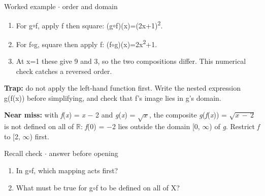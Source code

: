 \documentclass[11pt]{article}
\begin{document}
\begin{keepsection}
\begin{workedbox}{Worked example \ensuremath{\cdot} order and domain}
\begin{enumerate}
\item For g\ensuremath{\circ}f, apply f then square: (g\ensuremath{\circ}f)(x)=(2x+1)\textsuperscript{2}.
\item For f\ensuremath{\circ}g, square then apply f: (f\ensuremath{\circ}g)(x)=2x\textsuperscript{2}+1.
\item At x=1 these give 9 and 3, so the two compositions differ. This numerical check catches a reversed order.
\end{enumerate}
\end{workedbox}

\begin{notebox}\textbf{Trap:} do not apply the left-hand function first. Write the nested expression g(f(x)) before simplifying, and check that f’s image lies in g’s domain.\end{notebox}

\begin{notebox}\textbf{Near miss:} with \textit{f}(\textit{x}) = \textit{x} \ensuremath{-} 2 and \textit{g}(\textit{x}) = \ensuremath{\sqrt{{x}}}, the composite \textit{g}(\textit{f}(\textit{x})) = \ensuremath{\sqrt{{x}\, -\, 2}} is not defined on all of \ensuremath{\mathbb{R}}: \textit{f}(0) = \ensuremath{-}2 lies outside the domain [0, \ensuremath{\infty}) of \textit{g}. Restrict \textit{f} to [2, \ensuremath{\infty}) first.\end{notebox}

\begin{recallbox}{Recall check \ensuremath{\cdot} answer before opening}
\begin{enumerate}
\item In g\ensuremath{\circ}f, which mapping acts first?
\item What must be true for g\ensuremath{\circ}f to be defined on all of X?
\end{enumerate}

\end{recallbox}
\end{keepsection}
\end{document}
